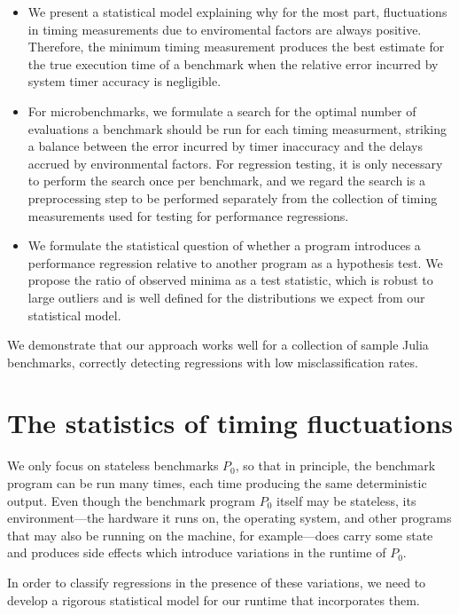 \documentclass[conference]{IEEEtran}
\begin{document}
\begin{itemize}
\item
We present a statistical model explaining why for the most part, fluctuations
in timing measurements due to enviromental factors are always positive.
Therefore, the minimum timing measurement produces the best estimate for
the true execution time of a benchmark when the relative error incurred by
system timer accuracy is negligible.

\item
For microbenchmarks, we formulate a search for the optimal number of evaluations
a benchmark should be run for each timing measurment, striking a balance between
the error incurred by timer inaccuracy and the delays accrued by environmental
factors. For regression testing, it is only necessary to perform the search once
per benchmark, and we regard the search is a preprocessing step to be performed
separately from the collection of timing measurements used for testing for
performance regressions.

\item
We formulate the statistical question of whether a program introduces a performance
regression relative to another program as a hypothesis test. We propose the
ratio of observed minima as a test statistic, which is robust to large outliers
and is well defined for the distributions we expect from our statistical model.
\end{itemize}

We demonstrate that our approach works well for a collection of sample Julia
benchmarks, correctly detecting regressions with low misclassification rates.



\section{The statistics of timing fluctuations}

We only focus on stateless benchmarks $P_0$, so that in principle, the benchmark program can be run many times, each time producing the same deterministic output. Even though the benchmark program $P_0$ itself may be stateless, its environment---the hardware it runs on, the operating system, and other programs that may also be running on the machine, for example---does carry some state and produces side effects which introduce variations in the runtime of $P_0$.

In order to classify regressions in the presence of these variations, we need to develop a rigorous statistical model for our runtime that incorporates them.
\end{document}
